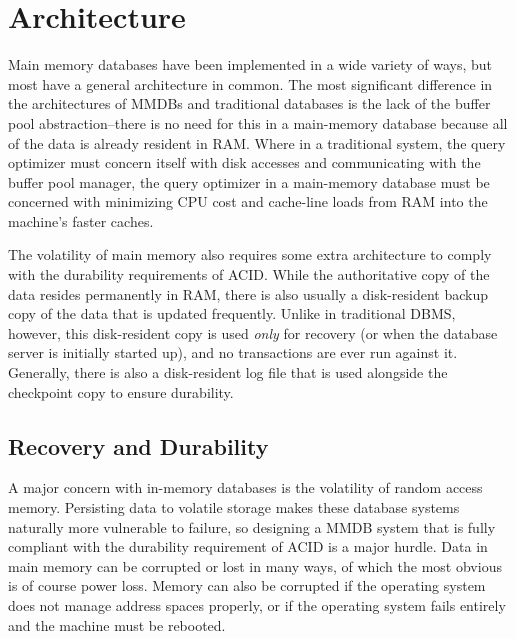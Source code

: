 \documentclass[11pt,a4paper]{report}
\begin{document}
\section{Architecture}
Main memory databases have been implemented in a wide variety of ways, but most have a general architecture in common. The most significant difference in the architectures of MMDBs and traditional databases is the lack of the buffer pool abstraction--there is no need for this in a main-memory database because all of the data is already resident in RAM. Where in a traditional system, the query optimizer must concern itself with disk accesses and communicating with the buffer pool manager, the query optimizer in a main-memory database must be concerned with minimizing CPU cost and cache-line loads from RAM into the machine's faster caches. 

The volatility of main memory also requires some extra architecture to comply with the durability requirements of ACID. While the authoritative copy of the data resides permanently in RAM, there is also usually a disk-resident backup copy of the data that is updated frequently. Unlike in traditional DBMS, however, this disk-resident copy is used \textit{only} for recovery (or when the database server is initially started up), and no transactions are ever run against it. Generally, there is also a disk-resident log file that is used alongside the checkpoint copy to ensure durability. 

\subsection{Recovery and Durability}
A major concern with in-memory databases is the volatility of random access memory. Persisting data to volatile storage makes these database systems naturally more vulnerable to failure, so designing a MMDB system that is fully compliant with the durability requirement of ACID is a major hurdle. Data in main memory can be corrupted or lost in many ways,  of which the most obvious is of course power loss. Memory can also be corrupted if the operating system does not manage address spaces properly, or if the operating system fails entirely and the machine must be rebooted.
\end{document}
